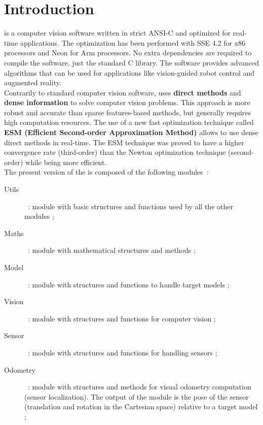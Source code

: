 \chapter{Introduction}
\label{cha:intro}

\rox{} is a computer vision software written in strict ANSI-C
and optimized for real-time applications. The optimization has been performed with SSE 4.2 for x86 processors and Neon for Arm processors.
No extra dependencies are required to compile the software, just the standard C library. The software provides advanced
algorithms that can be used for applications like vision-guided robot
control and augmented reality. \\

Contrarily to standard computer vision software, \rox{} uses {\bf
direct methods} and {\bf dense information} to solve computer vision
problems. This approach is more robust and accurate than sparse
features-based methods, but generally requires high computation
resources. The use of a new fast optimization technique called {\bf
ESM (Efficient Second-order Approximation Method)} allows to use dense
direct methods in real-time. The ESM technique was proved to have a
higher convergence rate (third-order) than the Newton optimization
technique (second-order) while being more efficient.\\

The present version of the \rox{} is composed of the following modules~:

\begin{description}
  \item[Utils]~: module with basic structures and functions used by all the other modules ;
  \item[Maths]~: module with mathematical structures and methods ;
  \item[Model]~: module with structures and functions to handle target models ;
  \item[Vision]~: module with structures and functions for computer vision ;
  \item[Sensor]~: module with structures and functions for handling sensors ;
  \item[Odometry]~: module with structures and methods for visual odometry computation (sensor localization). The output of the module is the pose of the sensor (translation and rotation in the Cartesian space) relative to a target model ;

\end{description}


%
